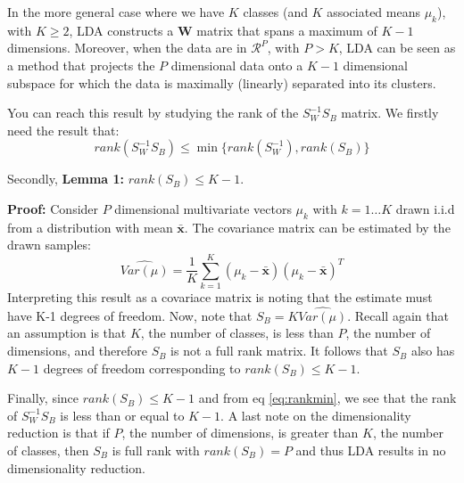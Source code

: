\documentclass{article}
\begin{document}
In the more general case where we have $K$ classes (and $K$ associated means $\mu_k$), with $K \geq 2$, LDA constructs a $\mathbf{W}$ matrix that spans a maximum of $K-1$ dimensions. Moreover, when the data are in $\mathcal{R}^P$, with $P > K$, LDA can be seen as a method that projects the $P$ dimensional data onto a $K-1$ dimensional subspace for which the data is maximally (linearly) separated into its clusters.


You can reach this result by studying the rank of the $S_W^{-1}S_B$ matrix. We firstly need the result\cite{petersen2008matrix} that:
\begin{equation}\label{eq:rankmin}
  rank(S_W^{-1}S_B) \leq \min\{ rank(S_W^{-1}), rank(S_B) \}
\end{equation}

Secondly, \textbf{Lemma 1:} $rank(S_B) \leq K-1$.

\textbf{Proof:} Consider $P$ dimensional multivariate vectors $\mu_k$ with $k = 1 \hdots K$ drawn i.i.d from a distribution with mean $\mathbf{\bar{x}}$. The covariance matrix can be estimated by the drawn samples:
$$
\hat{Var(\mu)} = \frac{1}{K} \sum\limits_{k=1}^K (\mu_k-\mathbf{\bar{x}})(\mu_k-\mathbf{\bar{x}})^T
$$
Interpreting this result as a covariace matrix is noting that the estimate must have K-1 degrees of freedom. Now, note that $S_B = K\hat{Var(\mu)}$. Recall again that an assumption is that $K$, the number of classes, is less than $P$, the number of dimensions, and therefore $S_B$ is not a full rank matrix. It follows that $S_B$ also has $K-1$ degrees of freedom corresponding to $rank(S_B) \leq K-1$.


Finally, since $rank(S_B) \leq K-1$ and from eq \ref{eq:rankmin}, we see that the rank of $S_W^{-1}S_B$ is less than or equal to $K-1$. A last note on the dimensionality reduction is that if $P$, the number of dimensions, is greater than $K$, the number of classes, then $S_B$ is full rank with $rank(S_B) = P$ and thus LDA results in no dimensionality reduction.


\end{document}
